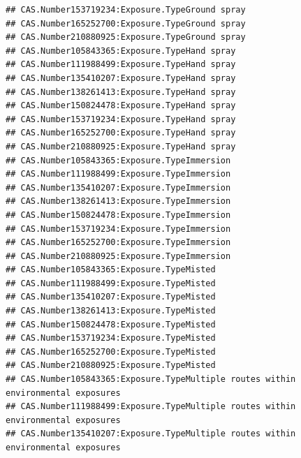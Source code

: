 \documentclass[
  12pt,
]{article}
\begin{document}
\begin{verbatim}
## CAS.Number153719234:Exposure.TypeGround spray                                      
## CAS.Number165252700:Exposure.TypeGround spray                                      
## CAS.Number210880925:Exposure.TypeGround spray                                      
## CAS.Number105843365:Exposure.TypeHand spray                                        
## CAS.Number111988499:Exposure.TypeHand spray                                        
## CAS.Number135410207:Exposure.TypeHand spray                                        
## CAS.Number138261413:Exposure.TypeHand spray                                        
## CAS.Number150824478:Exposure.TypeHand spray                                        
## CAS.Number153719234:Exposure.TypeHand spray                                        
## CAS.Number165252700:Exposure.TypeHand spray                                        
## CAS.Number210880925:Exposure.TypeHand spray                                        
## CAS.Number105843365:Exposure.TypeImmersion                                         
## CAS.Number111988499:Exposure.TypeImmersion                                         
## CAS.Number135410207:Exposure.TypeImmersion                                         
## CAS.Number138261413:Exposure.TypeImmersion                                         
## CAS.Number150824478:Exposure.TypeImmersion                                         
## CAS.Number153719234:Exposure.TypeImmersion                                         
## CAS.Number165252700:Exposure.TypeImmersion                                         
## CAS.Number210880925:Exposure.TypeImmersion                                         
## CAS.Number105843365:Exposure.TypeMisted                                            
## CAS.Number111988499:Exposure.TypeMisted                                            
## CAS.Number135410207:Exposure.TypeMisted                                            
## CAS.Number138261413:Exposure.TypeMisted                                            
## CAS.Number150824478:Exposure.TypeMisted                                            
## CAS.Number153719234:Exposure.TypeMisted                                            
## CAS.Number165252700:Exposure.TypeMisted                                            
## CAS.Number210880925:Exposure.TypeMisted                                            
## CAS.Number105843365:Exposure.TypeMultiple routes within environmental exposures    
## CAS.Number111988499:Exposure.TypeMultiple routes within environmental exposures    
## CAS.Number135410207:Exposure.TypeMultiple routes within environmental exposures    

\end{verbatim}
\end{document}
